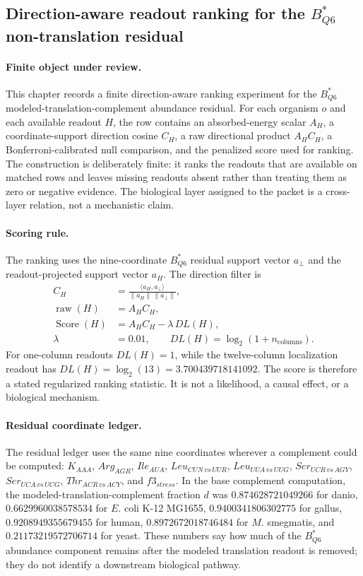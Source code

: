 \subsection{Direction-aware readout ranking for the $B^*_{Q6}$ non-translation residual}
\label{subsec:q6-h-ranking-table-direction-aware-cross-layer}

\paragraph{Finite object under review.}
This chapter records a finite direction-aware ranking experiment for the $B^*_{Q6}$ modeled-translation-complement abundance residual.  For each organism $o$ and each available readout $H$, the row contains an absorbed-energy scalar $A_H$, a coordinate-support direction cosine $C_H$, a raw directional product $A_H C_H$, a Bonferroni-calibrated null comparison, and the penalized score used for ranking.  The construction is deliberately finite: it ranks the readouts that are available on matched rows and leaves missing readouts absent rather than treating them as zero or negative evidence.  The biological layer assigned to the packet is a cross-layer relation, not a mechanistic claim.

\paragraph{Scoring rule.}
The ranking uses the nine-coordinate $B^*_{Q6}$ residual support vector $a_\perp$ and the readout-projected support vector $a_H$.  The direction filter is
$$
\begin{aligned}
C_H &= \frac{\langle a_H,a_\perp\rangle}{\lVert a_H\rVert\,\lVert a_\perp\rVert},\\
\operatorname{raw}(H) &= A_H C_H,\\
\operatorname{Score}(H) &= A_H C_H - \lambda\,DL(H),\\
\lambda &= 0.01,\qquad DL(H)=\log_2(1+n_{\mathrm{columns}}).
\end{aligned}
$$
For one-column readouts $DL(H)=1$, while the twelve-column localization readout has $DL(H)=\log_2(13)=3.700439718141092$.  The score is therefore a stated regularized ranking statistic.  It is not a likelihood, a causal effect, or a biological mechanism.

\paragraph{Residual coordinate ledger.}
The residual ledger uses the same nine coordinates wherever a complement could be computed: $K_{AAA}$, $Arg_{AGR}$, $Ile_{AUA}$, $Leu_{CUN\,vs\,UUR}$, $Leu_{UUA\,vs\,UUG}$, $Ser_{UCR\,vs\,AGY}$, $Ser_{UCA\,vs\,UCG}$, $Thr_{ACR\,vs\,ACY}$, and $f3_{stress}$.  In the base complement computation, the modeled-translation-complement fraction $d$ was $0.874628721049266$ for danio, $0.6629960038578534$ for $E.$ coli K-12 MG1655, $0.9400341806302775$ for gallus, $0.9208949355679455$ for human, $0.8972672018746484$ for $M.$ smegmatis, and $0.21173219572706714$ for yeast.  These numbers say how much of the $B^*_{Q6}$ abundance component remains after the modeled translation readout is removed; they do not identify a downstream biological pathway.

